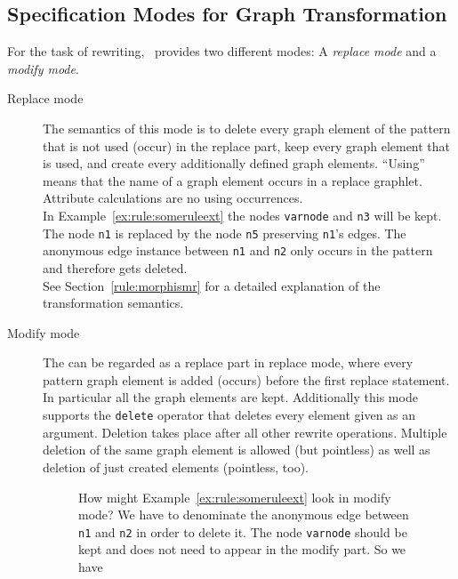 \subsection{Specification Modes for Graph Transformation}
For the task of rewriting, \GrG\ provides two different modes: A \emph{replace mode} and a \emph{modify mode}.
\begin{description}
  \item[Replace mode] The semantics of this mode is to delete every graph element of the pattern that is not used (occur) in the replace part, keep every graph element that is used, and create every additionally defined graph elements. ``Using'' means that the name of a graph element occurs in a replace graphlet. Attribute calculations are no using occurrences.\\
  In Example~\ref{ex:rule:someruleext} the nodes \texttt{varnode} and \texttt{n3} will be kept. The node \texttt{n1} is replaced by the node \texttt{n5} preserving \texttt{n1}'s edges. The anonymous edge instance between \texttt{n1} and \texttt{n2} only occurs in the pattern and therefore gets deleted.\\
See Section~\ref{rule:morphismr} for a detailed explanation of the transformation semantics. 
  \item[Modify mode] The  can be regarded as a replace part in replace mode, where every pattern graph element is added (occurs) before the first replace statement. 
In particular all the  graph elements are kept. 
Additionally this mode supports the \texttt{delete} operator that deletes every element given as an argument. 
Deletion takes place after all other rewrite operations. Multiple deletion of the same graph element is allowed (but pointless) as well as deletion of just created elements (pointless, too).
\begin{figure}[htbp]
\begin{example}
How might Example~\ref{ex:rule:someruleext} look in modify mode? 
We have to denominate the anonymous edge between \texttt{n1} and \texttt{n2} in order to delete it. 
The node \texttt{varnode} should be kept and does not need to appear in the modify part. 
So we have
\begin{grgen}
rule SomeRuleExtModify(varnode: Node): (Node, EdgeTypeB)  {
  ...
  n1 -e0:Edge-> n2;
  ...
  modify {
    n5:NodeTypeC<n1>;
    n3 -e1:EdgeTypeB-> n5;
    delete(e0);
    eval {
      ...
\end{grgen}
\end{example}
\end{figure}
\end{description}

